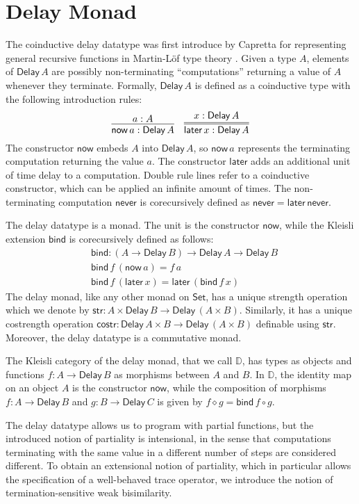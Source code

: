 \documentclass[runningheads]{llncs}
\newcommand{\Set}{\mathsf{Set}}
\newcommand{\comp}{\circ}
\newcommand{\Delay}{\mathsf{Delay}\,}
\newcommand{\now}{\mathsf{now}}
\newcommand{\later}{\mathsf{later}}
\newcommand{\never}{\mathsf{never}}
\newcommand{\bind}{\mathsf{bind}}
\newcommand{\str}{\mathsf{str}}
\newcommand{\costr}{\mathsf{costr}}
\newcommand{\D}{\mathbb{D}}
\begin{document}
\section{Delay Monad}\label{sec:delay}

The coinductive delay datatype was first introduce by Capretta for
representing general recursive functions in Martin-L\"of type theory
\cite{Capretta05}.  Given a type $A$, elements of $\Delay A$ are
possibly non-terminating ``computations'' returning a value of $A$
whenever they terminate. Formally, $\Delay A$ is defined as a
coinductive type with the following introduction rules:
\[
\infer{\now\,a : \Delay A}{a : A}
\quad
\infer={\later\,x : \Delay A}{x : \Delay A}
\]
The constructor $\now$ embeds $A$ into $\Delay A$, so $\now\,a$
represents the terminating computation returning the value $a$. The
constructor $\later$ adds an additional unit of time delay to a
computation. Double rule lines refer to a coinductive constructor,
which can be applied an infinite amount of times.
The non-terminating computation $\never$
is corecursively defined as $\never = \later \,\never$.

The delay datatype is a monad. The unit is the constructor $\now$,
while the Kleisli extension $\bind$ is corecursively defined as follows:
\begin{align*}
& \bind : (A \to \Delay B) \to \Delay A \to \Delay B \\
& \bind \,f \, (\now\,a) = f\,a \\
& \bind\,f\,(\later\,x) = \later\,(\bind\,f\,x)
\end{align*}
The delay monad, like any other monad on $\Set$, has a unique strength
operation which we denote by $\str : A \times \Delay B \to \Delay (A
\times B)$. Similarly, it has a unique costrength operation $\costr :
\Delay A \times B \to \Delay (A \times B)$ definable using $\str$. Moreover, the delay datatype is a commutative monad.

The Kleisli category of the delay monad, that we call $\D$, has types
as objects and functions $f : A \to \Delay B$ as morphisms between $A$
and $B$. In $\D$, the identity map on an object $A$ is the constructor
$\now$, while the composition of morphisms $f : A \to \Delay B$ and $g
: B \to \Delay C$ is given by $f \diamond g = \bind\,f \comp g$.

The delay datatype allows us to program with partial functions, but
the introduced notion of partiality is intensional, in the sense that
computations terminating with the same value in a different number of
steps are considered different. To obtain an extensional notion of
partiality, which in particular allows the specification of a
well-behaved trace operator, we introduce the notion of termination-sensitive
weak bisimilarity.
\end{document}
